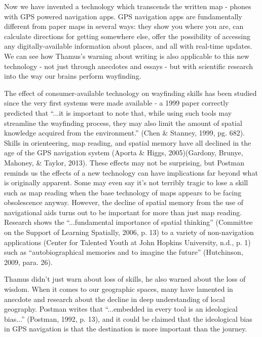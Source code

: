 \documentclass[a4paper]{article}
\begin{document}
Now we have invented a technology which transcends the written map - phones with GPS powered navigation apps. GPS navigation apps are fundamentally different from paper maps in several ways: they show you where you are, can calculate directions for getting somewhere else, offer the possibility of accessing any digitally-available information about places, and all with real-time updates. We can see how Thamus’s warning about writing is also applicable to this new technology - not just through anecdotes and essays - but with scientific research into the way our brains perform wayfinding.

The effect of consumer-available technology on wayfinding skills has been studied since the very first systems were made available - a 1999 paper correctly predicted that “...it is important to note that, while using such tools may streamline the wayfinding process, they may also limit the amount of spatial knowledge acquired from the environment.” (Chen \& Stanney, 1999, pg. 682). Skills in orienteering, map reading, and spatial memory have all declined in the age of the GPS navigation system (Aporta \& Higgs, 2005)(Gardony, Brunye, Mahoney, \& Taylor, 2013).  These effects may not be surprising, but Postman reminds us the effects of a new technology can have implications far beyond what is originally apparent. Some may even say it’s not terribly tragic to lose a skill such as map reading when the base technology of maps appears to be facing obsolescence anyway. However, the decline of spatial memory from the use of navigational aids turns out to be important for more than just map reading. Research shows the “...fundamental importance of spatial thinking” (Committee on the Support of Learning Spatially, 2006, p. 13) to a variety of non-navigation applications (Center for Talented Youth at John Hopkins University, n.d., p. 1) such as “autobiographical memories and to imagine the future” (Hutchinson, 2009, para. 26). 

Thamus didn’t just warn about loss of skills, he also warned about the loss of wisdom. When it comes to our geographic spaces, many have lamented in anecdote and research about the decline in deep understanding of local geography. Postman writes that “...embedded in every tool is an ideological bias...” (Postman, 1992, p. 13), and it could be claimed that the ideological bias in GPS navigation is that the destination is more important than the journey.
\end{document}
